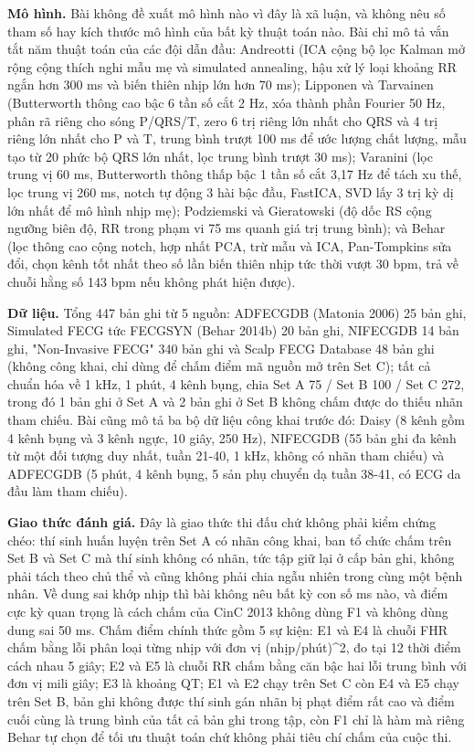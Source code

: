 \documentclass[12pt,a4paper]{article}
\begin{document}
\noindent \textbf{Mô hình.} Bài không đề xuất mô hình nào vì đây là xã luận, và không nêu số tham số hay kích thước mô hình của bất kỳ thuật toán nào. Bài chỉ mô tả vắn tắt năm thuật toán của các đội dẫn đầu: Andreotti (ICA cộng bộ lọc Kalman mở rộng cộng thích nghi mẫu mẹ và simulated annealing, hậu xử lý loại khoảng RR ngắn hơn 300 ms và biến thiên nhịp lớn hơn 70 ms); Lipponen và Tarvainen (Butterworth thông cao bậc 6 tần số cắt 2 Hz, xóa thành phần Fourier 50 Hz, phân rã riêng cho sóng P/QRS/T, zero 6 trị riêng lớn nhất cho QRS và 4 trị riêng lớn nhất cho P và T, trung bình trượt 100 ms để ước lượng chất lượng, mẫu tạo từ 20 phức bộ QRS lớn nhất, lọc trung bình trượt 30 ms); Varanini (lọc trung vị 60 ms, Butterworth thông thấp bậc 1 tần số cắt 3,17 Hz để tách xu thế, lọc trung vị 260 ms, notch tự động 3 hài bậc đầu, FastICA, SVD lấy 3 trị kỳ dị lớn nhất để mô hình nhịp mẹ); Podziemski và Gieratowski (độ dốc RS cộng ngưỡng biên độ, RR trong phạm vi 75 ms quanh giá trị trung bình); và Behar (lọc thông cao cộng notch, hợp nhất PCA, trừ mẫu và ICA, Pan-Tompkins sửa đổi, chọn kênh tốt nhất theo số lần biến thiên nhịp tức thời vượt 30 bpm, trả về chuỗi hằng số 143 bpm nếu không phát hiện được).\par\vspace{3pt}
\noindent \textbf{Dữ liệu.} Tổng 447 bản ghi từ 5 nguồn: ADFECGDB (Matonia 2006) 25 bản ghi, Simulated FECG tức FECGSYN (Behar 2014b) 20 bản ghi, NIFECGDB 14 bản ghi, "Non-Invasive FECG" 340 bản ghi và Scalp FECG Database 48 bản ghi (không công khai, chỉ dùng để chấm điểm mã nguồn mở trên Set C); tất cả chuẩn hóa về 1 kHz, 1 phút, 4 kênh bụng, chia Set A 75 / Set B 100 / Set C 272, trong đó 1 bản ghi ở Set A và 2 bản ghi ở Set B không chấm được do thiếu nhãn tham chiếu. Bài cũng mô tả ba bộ dữ liệu công khai trước đó: Daisy (8 kênh gồm 4 kênh bụng và 3 kênh ngực, 10 giây, 250 Hz), NIFECGDB (55 bản ghi đa kênh từ một đối tượng duy nhất, tuần 21-40, 1 kHz, không có nhãn tham chiếu) và ADFECGDB (5 phút, 4 kênh bụng, 5 sản phụ chuyển dạ tuần 38-41, có ECG da đầu làm tham chiếu).\par\vspace{3pt}
\noindent \textbf{Giao thức đánh giá.} Đây là giao thức thi đấu chứ không phải kiểm chứng chéo: thí sinh huấn luyện trên Set A có nhãn công khai, ban tổ chức chấm trên Set B và Set C mà thí sinh không có nhãn, tức tập giữ lại ở cấp bản ghi, không phải tách theo chủ thể và cũng không phải chia ngẫu nhiên trong cùng một bệnh nhân. Về dung sai khớp nhịp thì bài không nêu bất kỳ con số ms nào, và điểm cực kỳ quan trọng là cách chấm của CinC 2013 không dùng F1 và không dùng dung sai 50 ms. Chấm điểm chính thức gồm 5 sự kiện: E1 và E4 là chuỗi FHR chấm bằng lỗi phân loại từng nhịp với đơn vị (nhịp/phút)\textasciicircum{}2, đo tại 12 thời điểm cách nhau 5 giây; E2 và E5 là chuỗi RR chấm bằng căn bậc hai lỗi trung bình với đơn vị mili giây; E3 là khoảng QT; E1 và E2 chạy trên Set C còn E4 và E5 chạy trên Set B, bản ghi không được thí sinh gán nhãn bị phạt điểm rất cao và điểm cuối cùng là trung bình của tất cả bản ghi trong tập, còn F1 chỉ là hàm mà riêng Behar tự chọn để tối ưu thuật toán chứ không phải tiêu chí chấm của cuộc thi.\par\vspace{3pt}
\end{document}
